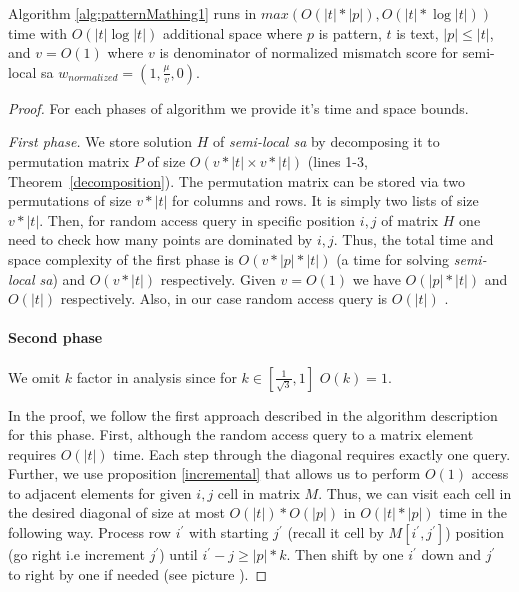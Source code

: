 \begin{theorem}
Algorithm \ref{alg:patternMathing1} runs in $max(O(|t|*|p|),O(|t| * \log |t|))$ time with $O( |t| \log |t|)$ additional space where $p$ is pattern, $t$ is text, $|p| \leq |t|$, and $v=O(1)$ where $v$ is denominator of normalized mismatch score for semi-local sa $w_{normalized} = (1,\frac{\mu}{v},0)$.
\end{theorem}
\begin{proof}
  For each phases of algorithm we provide it's time and space bounds.
  
\emph{First phase.}
We store solution $H$ of \emph{semi-local sa} by decomposing it to permutation matrix $P$ of size $O(v*|t|\times v*|t|)$ (lines 1-3, Theorem~\ref{decomposition}).
The permutation matrix can be stored via two permutations of size $v*|t|$ for columns and rows.
It is simply two lists of size $v*|t|$.
Then, for random access query in specific position $i,j$ of matrix $H$ one need to check how many points are dominated by $i,j$.
Thus, the total time and space complexity of the first phase is $O(v *|p| * |t|)$ (a time for solving \emph{semi-local sa}) and $O(v*|t|)$ respectively.
Given $v=O(1)$ we have $O(|p| * |t|)$ and $O(|t|)$ respectively.
Also, in our case random access query is $O(|t|)$ .



\paragraph{Second phase}
We omit $k$ factor in analysis since for $k \in [\frac{1}{\sqrt{3}},1]$ $O(k) = 1$.

In the proof, we follow the first approach described in the algorithm description for this phase.
First, although the random access query to a matrix element requires $O(|t|)$ time.
Each step through the diagonal requires exactly one query.
Further, we use  proposition \ref{incremental} that allows us to perform $O(1)$ access to adjacent elements for given $i,j$ cell in matrix $M$.
Thus, we can visit each cell in the desired diagonal of size at most $O(|t|) * O(|p|) $ in $O(|t|*|p|)$ time in the following way.
Process row $i^{'}$ with starting $j^{'}$ (recall it cell by $M[i^{'},j^{'}]$) position  (go right i.e increment $j^{'}$) until $i^{'}-j \geq |p|*k$.
Then shift by one $i^{'}$ down and $j^{'}$ to right by one if needed (see picture ).


\end{proof}
